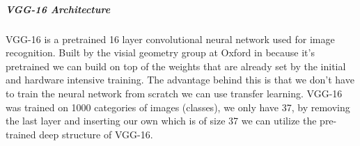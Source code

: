 \subparagraph{VGG-16 Architecture}
VGG-16 is a pretrained 16 layer convolutional neural network used for image recognition. Built by the visial geometry group at Oxford in \citeyear{vgg16-arxiv} \cite{vgg16-arxiv} because it's pretrained we can build on top of the weights that are already set by the initial and hardware intensive training. The advantage behind this is that we don't have to train the neural network from scratch we can use transfer learning. VGG-16 was trained on 1000 categories of images (classes), we only have 37, by removing the last layer and inserting our own which is of size 37 we can utilize the pre-trained deep structure of VGG-16.


